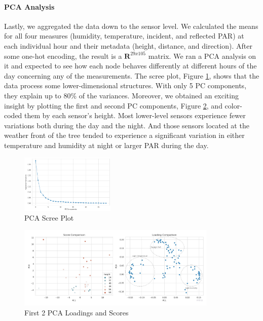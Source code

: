 \documentclass[11pt, letterpaper]{article}
\begin{document}
\paragraph{PCA Analysis}
Lastly, we aggregated the data down to the sensor level. We calculated the means for all four measures (humidity, temperature, incident, and reflected PAR) at each individual hour and their metadata (height, distance, and direction). After some one-hot encoding, the result is a $\mathbf{R}^{29x105}$ matrix. We ran a PCA analysis on it and expected to see how each node behaves differently at different hours of the day concerning any of the measurements. The scree plot, Figure \ref{fig:pca_scree}, shows that the data process some lower-dimensional structures. With only 5 PC components, they explain up to 80\% of the variances. Moreover, we obtained an exciting insight by plotting the first and second PC components, Figure \ref{fig:pca_comp}, and color-coded them by each sensor's height. Most lower-level sensors experience fewer variations both during the day and the night. And those sensors located at the weather front of the tree tended to experience a significant variation in either temperature and humidity at night or larger PAR during the day.
\begin{figure}[h!]
\centering
\includegraphics[width=0.4\textwidth]{eda_3.7.png}
\captionsetup{justification=centering}
\caption{PCA Scree Plot}
\label{fig:pca_scree}
\end{figure}
\begin{figure}[h!]
\centering
\includegraphics[width=0.85\textwidth]{eda_3.6.jpg}
\captionsetup{justification=centering}
\caption{First 2 PCA Loadings and Scores}
\label{fig:pca_comp}
\end{figure}
\end{document}
